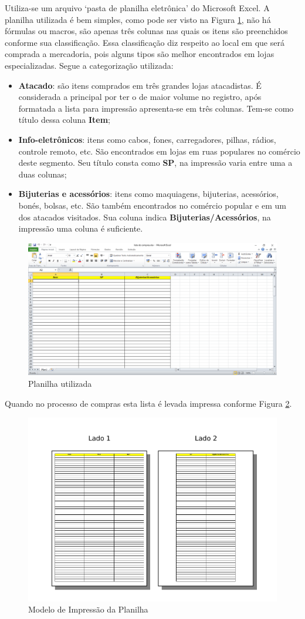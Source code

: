 \documentclass[12pt]{article}
\begin{document}
Utiliza-se um arquivo `pasta de planilha eletrônica' do Microsoft Excel. A planilha utilizada é bem simples, como pode ser visto na Figura  \ref{fig:planilha}, não há fórmulas ou macros, são apenas três colunas nas quais os itens são preenchidos conforme sua classificação. Essa classificação diz respeito ao local em que será comprada a mercadoria, pois alguns tipos são melhor encontrados em lojas especializadas. Segue a categorização utilizada:

\begin{itemize}
\item \textbf{Atacado}: são itens comprados em três grandes lojas atacadistas. É considerada a principal por ter o de maior volume no registro, após formatada a lista para impressão apresenta-se em três colunas. Tem-se como título dessa coluna \textbf{Item};
\item \textbf{Info-eletrônicos}: itens como cabos, fones, carregadores, pilhas, rádios, controle remoto, etc. São encontrados em lojas em ruas populares no comércio deste segmento. Seu título consta como \textbf{SP}, na impressão varia entre uma a duas colunas;
\item \textbf{Bijuterias e acessórios}: itens como maquiagens, bijuterias, acessórios, bonés, bolsas, etc. São também encontrados no comércio popular e em um dos atacados visitados. Sua coluna indica \textbf{Bijuterias/Acessórios}, na impressão uma coluna é suficiente.
\end{itemize}

\begin{figure}[ht]
\centering
\includegraphics[width=.5\textwidth,keepaspectratio]{figures/lista-excel.pdf}
\caption{Planilha utilizada}
\label{fig:planilha}
\end{figure}

Quando no processo de compras esta lista é levada impressa conforme Figura \ref{fig:impressao}.

\begin{figure}[ht]
\centering
\includegraphics[width=.5\textwidth,keepaspectratio]{figures/modelo-impressao.pdf}
\caption{Modelo de Impressão da Planilha}
\label{fig:impressao}
\end{figure}



\end{document}
